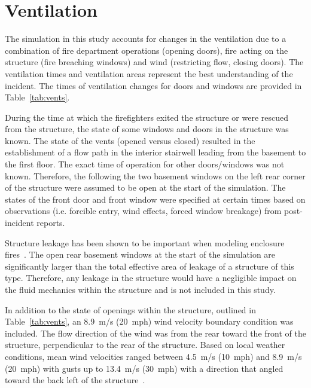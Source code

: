 \documentclass[12pt,oneside]{book}
\begin{document}
\section{Ventilation}
\label{Vents}
The simulation in this study accounts for changes in the ventilation due to a combination of fire department operations (opening doors), fire acting on the structure (fire breaching windows) and wind (restricting flow, closing doors). The ventilation times and ventilation areas represent the best understanding of the incident. The times of ventilation changes for doors and windows are provided in Table~\ref{tab:vents}.

During the time at which the firefighters exited the structure or were rescued from the structure, the state of some windows and doors in the structure was known. The state of the vents (opened versus closed) resulted in the establishment of a flow path in the interior stairwell leading from the basement to the first floor. The exact time of operation for other doors/windows was not known. Therefore, the following the two basement windows on the left rear corner of the structure were assumed to be open at the start of the simulation. The states of the front door and front window were specified at certain times based on observations (i.e. forcible entry, wind effects, forced window breakage) from post-incident reports.

Structure leakage has been shown to be important when modeling enclosure fires~\cite{beal2009}. The open rear basement windows at the start of the simulation are significantly larger than the total effective area of leakage of a structure of this type. Therefore, any leakage in the structure would have a negligible impact on the fluid mechanics within the structure and is not included in this study.

In addition to the state of openings within the structure, outlined in Table~\ref{tab:vents}, an 8.9~m/s (20~mph) wind velocity boundary condition was included. The flow direction of the wind was from the rear toward the front of the structure, perpendicular to the rear of the structure.  Based on local weather conditions, mean wind velocities ranged between 4.5~m/s (10~mph) and 8.9~m/s (20~mph) with gusts up to 13.4~m/s (30~mph) with a direction that angled toward the back left of the structure~\cite{PGCounty2013}.
\end{document}
